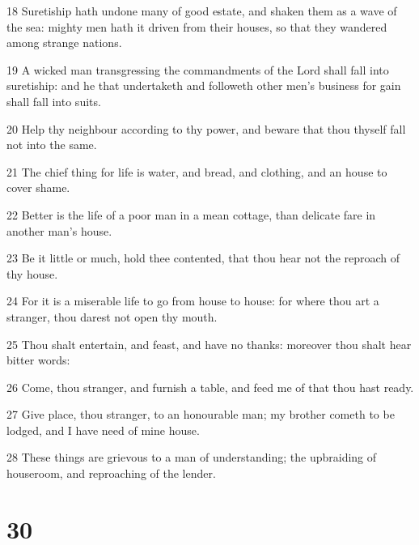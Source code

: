 \par 18 Suretiship hath undone many of good estate, and shaken them as a wave of the sea: mighty men hath it driven from their houses, so that they wandered among strange nations.
\par 19 A wicked man transgressing the commandments of the Lord shall fall into suretiship: and he that undertaketh and followeth other men's business for gain shall fall into suits.
\par 20 Help thy neighbour according to thy power, and beware that thou thyself fall not into the same.
\par 21 The chief thing for life is water, and bread, and clothing, and an house to cover shame.
\par 22 Better is the life of a poor man in a mean cottage, than delicate fare in another man's house.
\par 23 Be it little or much, hold thee contented, that thou hear not the reproach of thy house.
\par 24 For it is a miserable life to go from house to house: for where thou art a stranger, thou darest not open thy mouth.
\par 25 Thou shalt entertain, and feast, and have no thanks: moreover thou shalt hear bitter words:
\par 26 Come, thou stranger, and furnish a table, and feed me of that thou hast ready.
\par 27 Give place, thou stranger, to an honourable man; my brother cometh to be lodged, and I have need of mine house.
\par 28 These things are grievous to a man of understanding; the upbraiding of houseroom, and reproaching of the lender.

\chapter{30}

